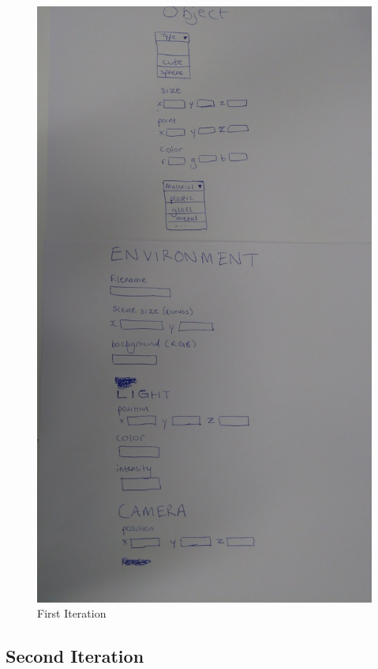 \documentclass[a4paper]{report}
\begin{document}
	\begin{figure}[ht!]
		\includegraphics[width=1\textwidth]{First_Iteration_Prototype.jpg}
		\caption{First Iteration}
		\label{fig:firstIt}
	\end{figure}
	
	\subsection{Second Iteration}
	
\end{document}
